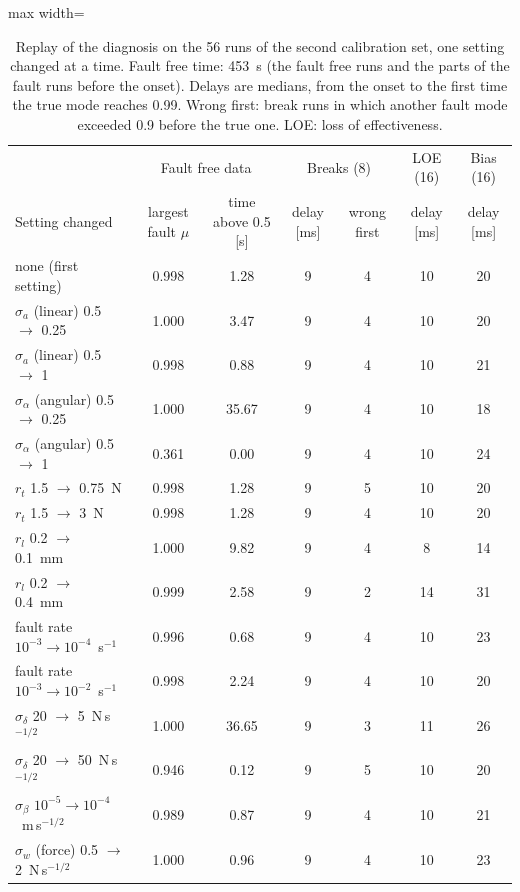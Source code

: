 \documentclass[10pt]{article}
\begin{document}
\begin{table}[h]
\centering\small
\caption{Replay of the diagnosis on the 56 runs of the second calibration set, one setting changed at a time. Fault free time: 453~s (the fault free runs and the parts of the fault runs before the onset). Delays are medians, from the onset to the first time the true mode reaches 0.99. Wrong first: break runs in which another fault mode exceeded 0.9 before the true one. LOE: loss of effectiveness.}\label{tab:replay}
\begin{adjustbox}{max width=\linewidth}\begin{tabular}{@{}lcccccc@{}}
\toprule
& \multicolumn{2}{c}{Fault free data} & \multicolumn{2}{c}{Breaks (8)} & LOE (16) & Bias (16) \\
Setting changed & largest fault $\mu$ & time above 0.5 [s] & delay [ms] & wrong first & delay [ms] & delay [ms] \\
\midrule
none (first setting) & 0.998 & 1.28 & 9 & 4 & 10 & 20 \\
$\sigma_{a}$ (linear) 0.5 $\to$ 0.25 & 1.000 & 3.47 & 9 & 4 & 10 & 20 \\
$\sigma_{a}$ (linear) 0.5 $\to$ 1 & 0.998 & 0.88 & 9 & 4 & 10 & 21 \\
$\sigma_{\alpha}$ (angular) 0.5 $\to$ 0.25 & 1.000 & 35.67 & 9 & 4 & 10 & 18 \\
$\sigma_{\alpha}$ (angular) 0.5 $\to$ 1 & 0.361 & 0.00 & 9 & 4 & 10 & 24 \\
$r_t$ 1.5 $\to$ 0.75~N & 0.998 & 1.28 & 9 & 5 & 10 & 20 \\
$r_t$ 1.5 $\to$ 3~N & 0.998 & 1.28 & 9 & 4 & 10 & 20 \\
$r_l$ 0.2 $\to$ 0.1~mm & 1.000 & 9.82 & 9 & 4 & 8 & 14 \\
$r_l$ 0.2 $\to$ 0.4~mm & 0.999 & 2.58 & 9 & 2 & 14 & 31 \\
fault rate $10^{-3}\to10^{-4}$~s$^{-1}$ & 0.996 & 0.68 & 9 & 4 & 10 & 23 \\
fault rate $10^{-3}\to10^{-2}$~s$^{-1}$ & 0.998 & 2.24 & 9 & 4 & 10 & 20 \\
$\sigma_\delta$ 20 $\to$ 5~N\,s$^{-1/2}$ & 1.000 & 36.65 & 9 & 3 & 11 & 26 \\
$\sigma_\delta$ 20 $\to$ 50~N\,s$^{-1/2}$ & 0.946 & 0.12 & 9 & 5 & 10 & 20 \\
$\sigma_\beta$ $10^{-5}\to10^{-4}$~m\,s$^{-1/2}$ & 0.989 & 0.87 & 9 & 4 & 10 & 21 \\
$\sigma_{w}$ (force) 0.5 $\to$ 2~N\,s$^{-1/2}$ & 1.000 & 0.96 & 9 & 4 & 10 & 23 \\

\end{tabular}
\end{adjustbox}
\end{table}
\end{document}
